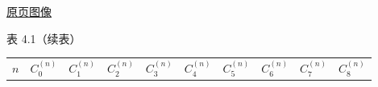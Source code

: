 \documentclass[
  10pt,
  fontset=fandol]{ctexart}
\newcounter{none} %
\begin{document}
\href{../../source-images/pdf-097.jpeg}{原页图像}

表 4.1（续表）

{\def\LTcaptype{none} %
\begin{longtable}[]{@{}
  >{\raggedright\arraybackslash}p{}
  >{\raggedright\arraybackslash}p{}
  >{\raggedright\arraybackslash}p{}
  >{\raggedright\arraybackslash}p{}
  >{\raggedright\arraybackslash}p{}
  >{\raggedright\arraybackslash}p{}
  >{\raggedright\arraybackslash}p{}
  >{\raggedright\arraybackslash}p{}
  >{\raggedright\arraybackslash}p{}
  >{\raggedright\arraybackslash}p{}@{}}
\toprule\noalign{}
\begin{minipage}[b]{\linewidth}\raggedright
\(n\)
\end{minipage} & \begin{minipage}[b]{\linewidth}\raggedright
\(C_0^{(n)}\)
\end{minipage} & \begin{minipage}[b]{\linewidth}\raggedright
\(C_1^{(n)}\)
\end{minipage} & \begin{minipage}[b]{\linewidth}\raggedright
\(C_2^{(n)}\)
\end{minipage} & \begin{minipage}[b]{\linewidth}\raggedright
\(C_3^{(n)}\)
\end{minipage} & \begin{minipage}[b]{\linewidth}\raggedright
\(C_4^{(n)}\)
\end{minipage} & \begin{minipage}[b]{\linewidth}\raggedright
\(C_5^{(n)}\)
\end{minipage} & \begin{minipage}[b]{\linewidth}\raggedright
\(C_6^{(n)}\)
\end{minipage} & \begin{minipage}[b]{\linewidth}\raggedright
\(C_7^{(n)}\)
\end{minipage} & \begin{minipage}[b]{\linewidth}\raggedright
\(C_8^{(n)}\)
\end{minipage} \\

\end{longtable}}
\end{document}
